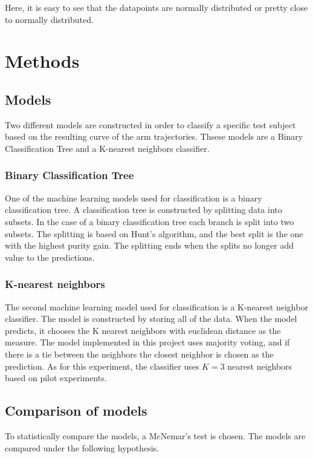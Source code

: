 \documentclass[11pt, fleqn, titlepage]{article}
\begin{document}
\noindent Here, it is easy to see that the datapoints are normally distributed or pretty close to normally distributed.

\section{Methods}

\subsection*{Models}
Two different models are constructed in order to classify a specific test subject based on the resulting curve of the arm trajectories. Thsese models are a Binary Classification Tree and a K-nearest neighbors classifier.

\subsubsection*{Binary Classification Tree}
One of the machine learning models used for classification is a binary classification tree. A classification tree is constructed by splitting data into subsets. In the case of a binary classification tree each branch is split into two subsets. The splitting is based on Hunt's algorithm, and the best split is the one with the highest purity gain. The splitting ends when the splits no longer add value to the predictions. 

\subsubsection*{K-nearest neighbors}
The second machine learning model used for classification is a K-nearest neighbor classifier. The model is constructed by storing all of the data. When the model predicts, it chooses the K nearest neighbors with euclidean distance as the measure. The model implemented in this project uses majority voting, and if there is a tie between the neighbors the closest neighbor is chosen as the prediction. As for this experiment, the classifier uses $ K=3 $ nearest neighbors based on pilot experiments.

\subsection*{Comparison of models}
To statistically compare the models, a McNemar's test is chosen. The models are compared under the following hypothesis. 
\end{document}
